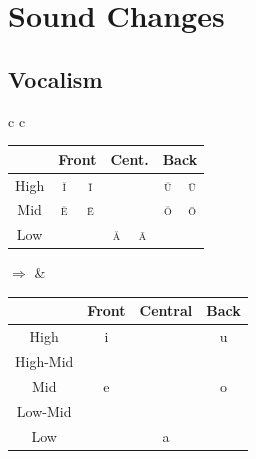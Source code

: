 \documentclass{report}[12pt]
\begin{document}
\section{Sound Changes}

\subsection{Vocalism}

\begin{tcolorbox}[title=Loss of Quantity, hbox]
  \begin{tabular}{c c}
    \begin{tabular}{|c|c|c|c|c|c|c|}
      \hline
      & \multicolumn{2}{c|}{Front} & \multicolumn{2}{c|}{Cent.} & \multicolumn{2}{c|}{Back} \\
      \hline
      High & \cellcolor{gray} \textsc{\u{i}} & \textsc{\={i}} & & & \cellcolor{gray} \textsc{\u{u}} & \textsc{\={u}} \\
      \hline
      Mid & \cellcolor{gray} \textsc{\u{e}} & \textsc{\={e}} & & & \cellcolor{gray} \textsc{\u{o}} & \textsc{\={o}} \\
      \hline
      Low &  &  & \cellcolor{gray} \textsc{\u{a}} & \textsc{\={a}} & & \\
      \hline
    \end{tabular}
    \quad $\Rightarrow$ & 
                          \begin{tabular}{|c|c|c|c|}
                            \hline
                            & Front & Central & Back \\
                            \hline
                            High & i & & u \\
                            \hline
                            High-Mid & \cellcolor{magenta} \textipa{I} & & \cellcolor{magenta} \textipa{U} \\
                            \hline
                            Mid & e & & o \\
                            \hline
                            Low-Mid & \cellcolor{magenta} \textipa{E} & & \cellcolor{magenta} \textipa{O} \\
                            \hline
                            Low & & a & \\
                            \hline
                          \end{tabular}
  \end{tabular}
\end{tcolorbox}
\end{document}
